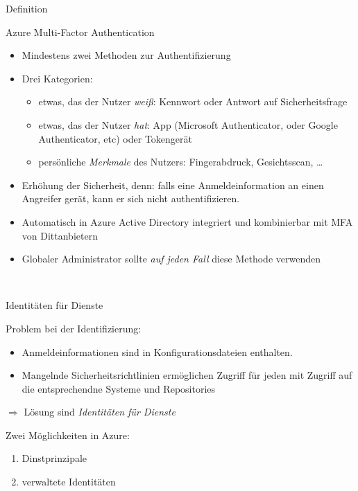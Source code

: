 \documentclass{scrartcl}
\newenvironment{flashcard}[2][]{%
    #1
    \vfill
    \centerline{\Large{#2}}
    \vfill
\newpage
}
{\newpage}
\begin{document}
    \begin{flashcard}[Definition]{Azure Multi-Factor Authentication}
        \begin{itemize}
            \item Mindestens zwei Methoden zur Authentifizierung
            \item Drei Kategorien:
                \begin{itemize}
                    \item etwas, das der Nutzer \emph{weiß}: Kennwort oder Antwort auf Sicherheitsfrage
                    \item etwas, das der Nutzer \emph{hat}: App (Microsoft Authenticator, oder Google Authenticator, etc) oder Tokengerät
                    \item persönliche \emph{Merkmale} des Nutzers: Fingerabdruck, Gesichtsscan, \ldots
            \end{itemize}
            \item Erhöhung der Sicherheit, denn: falls eine Anmeldeinformation an einen Angreifer gerät, kann er sich nicht authentifizieren.
            \item Automatisch in Azure Active Directory integriert und kombinierbar mit MFA von Dittanbietern
            \item Globaler Administrator sollte \emph{auf jeden Fall} diese Methode verwenden
        \end{itemize}
    \end{flashcard}

    \begin{flashcard}[\ ]{Identitäten für Dienste}
            Problem bei der Identifizierung:
            \begin{itemize}
                \item Anmeldeinformationen sind in Konfigurationsdateien enthalten.
                \item Mangelnde Sicherheitsrichtlinien ermöglichen Zugriff für jeden mit Zugriff auf die entsprechendne Systeme und Repositories
            \end{itemize}
            $\Rightarrow$ Lösung sind \emph{Identitäten für Dienste}

            Zwei Möglichkeiten in Azure:
            \begin{enumerate}
                \item Dinstprinzipale
                \item verwaltete Identitäten
            \end{enumerate}
    \end{flashcard}
\end{document}
